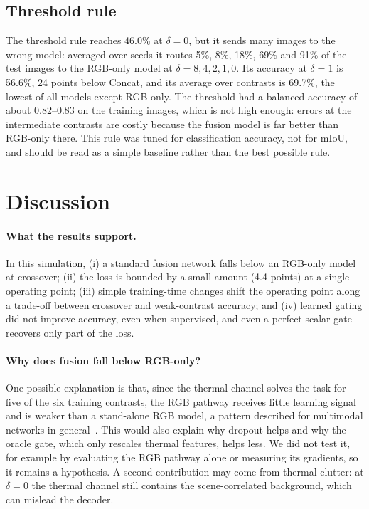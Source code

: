 \documentclass[runningheads]{llncs}
\begin{document}
\subsection{Threshold rule}
The threshold rule reaches 46.0\% at $\delta=0$, but it sends many images to the wrong model: averaged over seeds it routes 5\%, 8\%, 18\%, 69\% and 91\% of the test images to the RGB-only model at $\delta=8,4,2,1,0$. Its accuracy at $\delta=1$ is 56.6\%, 24 points below Concat, and its average over contrasts is 69.7\%, the lowest of all models except RGB-only. The threshold had a balanced accuracy of about 0.82--0.83 on the training images, which is not high enough: errors at the intermediate contrasts are costly because the fusion model is far better than RGB-only there. This rule was tuned for classification accuracy, not for mIoU, and should be read as a simple baseline rather than the best possible rule.

\section{Discussion}\label{sec:disc}
\paragraph{What the results support.} In this simulation, (i) a standard fusion network falls below an RGB-only model at crossover; (ii) the loss is bounded by a small amount (4.4 points) at a single operating point; (iii) simple training-time changes shift the operating point along a trade-off between crossover and weak-contrast accuracy; and (iv) learned gating did not improve accuracy, even when supervised, and even a perfect scalar gate recovers only part of the loss.

\paragraph{Why does fusion fall below RGB-only?} One possible explanation is that, since the thermal channel solves the task for five of the six training contrasts, the RGB pathway receives little learning signal and is weaker than a stand-alone RGB model, a pattern described for multimodal networks in general~\cite{wang2020,peng2022}. This would also explain why dropout helps and why the oracle gate, which only rescales thermal features, helps less. We did not test it, for example by evaluating the RGB pathway alone or measuring its gradients, so it remains a hypothesis. A second contribution may come from thermal clutter: at $\delta=0$ the thermal channel still contains the scene-correlated background, which can mislead the decoder.
\end{document}
